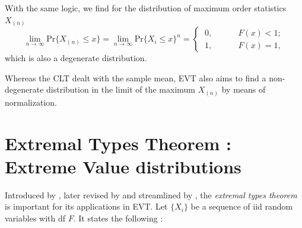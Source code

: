 With the same logic, we find for the distribution of maximum order statistics $X_{(n)}$ 
\begin{equation}
\displaystyle{\lim_{n \to \infty}}\text{Pr}\big\{X_{(n)}\leq x\big\}=\displaystyle{\lim_{n \to \infty}}\text{Pr}\big\{X_i\leq x\big\}^n=\begin{cases}
\ 0, \ \ \ \ \ \ \ \ \ \ \  \ \ \ F(x)<1; \\ 
\ 1, \ \ \ \ \ \ \ \ \ \ \ \  \ \ F(x)=1,
\end{cases}
\end{equation}
which is also a degenerate distribution.

Whereas the CLT dealt with the sample mean, EVT also aims to find a non-degenerate distribution in the limit of the maximum $X_{(n)}$ by means of normalization. %


\section{Extremal Types Theorem : Extreme Value distributions}\label{sec:extrtypethm}


Introduced by \cite{fisher_limiting_1928}, later revised by \cite{gnedenko_sur_1943} and streamlined by \cite{de_haan_regular_1970}, the \emph{extremal types theorem} is important for its applications in EVT. Let $\{X_i\}$ be a sequence of iid random variables with df $F$. It states the following :  

